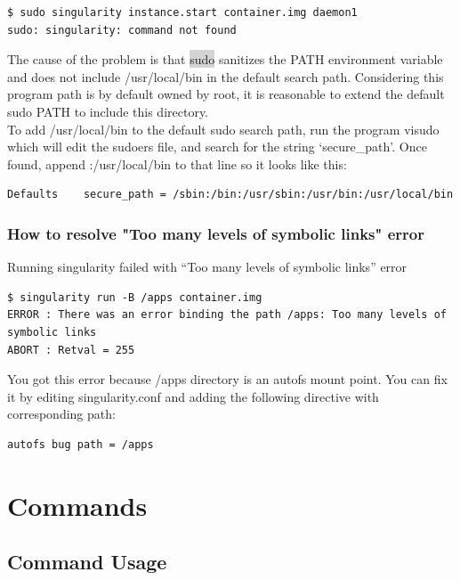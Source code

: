\documentclass[a4paper]{article}
\begin{document}
\begin{lstlisting}[frame=single]
$ sudo singularity instance.start container.img daemon1
sudo: singularity: command not found
\end{lstlisting}


The cause of the problem is that  \colorbox{lightgray}{sudo} sanitizes the PATH environment variable and does not include /usr/local/bin in the default search path. Considering this program path is by default owned by root, it is reasonable to extend the default sudo PATH to include this directory.\\[0.1in]

To add /usr/local/bin to the default sudo search path, run the program visudo which will edit the sudoers file, and search for the string ‘secure\_path’. Once found, append :/usr/local/bin to that line so it looks like this:

\begin{lstlisting}[frame=single]
Defaults    secure_path = /sbin:/bin:/usr/sbin:/usr/bin:/usr/local/bin
\end{lstlisting}

\subsubsection{How to resolve "Too many levels of symbolic links" error}
Running singularity failed with “Too many levels of symbolic links” error\\[0.1in]

\begin{lstlisting}[frame=single]
$ singularity run -B /apps container.img
ERROR : There was an error binding the path /apps: Too many levels of symbolic links
ABORT : Retval = 255
\end{lstlisting}

You got this error because /apps directory is an autofs mount point. You can fix it by editing singularity.conf and adding the following directive with corresponding path:

\begin{lstlisting}[frame=single]
autofs bug path = /apps
\end{lstlisting}
\section{Commands}

\subsection{Command Usage}
\label{sec:commandlineinterface}
\end{document}

